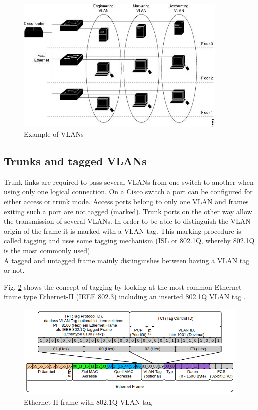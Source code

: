 \begin{figure}[ht!]
	\centering
	\includegraphics[width=0.9\textwidth]{BilderAllgemein/example_vlans.jpg}
	\caption{Example of VLANs \cite{cisco:vlan}}
	\label{img:example_of_vlans}
\end{figure}

\subsection{Trunks and tagged VLANs}

Trunk links are required to pass several VLANs from one switch to another when using only one logical connection. On a Cisco switch a port can be configured for either access or trunk mode. Access ports belong to only one VLAN and frames exiting such a port are not tagged (marked). Trunk ports on the other way allow the transmission of several VLANs. In order to be able to distinguish the VLAN origin of the frame it is marked with a VLAN tag. This marking procedure is called tagging and uses some tagging mechanism (ISL or 802.1Q, whereby 802.1Q is the most commonly used). \\
A tagged and untagged frame mainly distinguishes between having a VLAN tag or not.

Fig. \ref{img:ethernet_ii_frame} shows the concept of tagging by looking at the most common Ethernet frame type Ethernet-II (IEEE 802.3) including an inserted 802.1Q VLAN tag \cite{ciscopress:vlan}.

\begin{figure}[ht!]
	\centering
	\includegraphics[width=1\textwidth]{BilderAllgemein/vlan_tag.png}
	\caption{Ethernet-II frame with 802.1Q VLAN tag \cite{krenn:tag}}
	\label{img:ethernet_ii_frame}
\end{figure}

